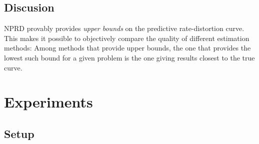 \documentclass[11pt,letterpaper]{article}
\newif \ifcomment
\newcommand\rljf[1]{\ifcomment{{\color{blue}(#1)}}\else{}\fi}
\newcounter{theorem}
\newtheorem{proposition}[theorem]{Proposition}
\begin{document}
%
%
%


\subsection{Discusion}

NPRD provably provides \emph{upper bounds} on the predictive rate-distortion curve.
This makes it possible to objectively compare the quality of different estimation methods:
Among methods that provide upper bounds, the one that provides the lowest such bound for a given problem is the one giving results closest to the true curve. \rljf{Does the sampling error issue arise here?}

\section{Experiments}

\subsection{Setup}


\end{document}
